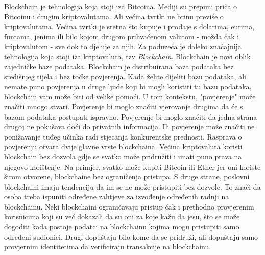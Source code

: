 \documentclass[times, utf8, diplomski]{fer}
\begin{document}
Blockchain je tehnologija koja stoji iza Bitcoina. Mediji su prepuni priča o Bitcoinu i drugim kriptovalutama. Ali većina tvrtki ne brinu previše o kriptovalutama. Većina tvrtki je sretna što kupuje i prodaje s dolarima, eurima, funtama,  jenima ili bilo kojom drugom prihvaćenom valutom - možda čak i kriptovalutom - sve dok to djeluje za njih. Za poduzeća je daleko značajnija tehnologija koja stoji iza kriptovaluta, tzv \textit{Blockchain}.
Blockchain je novi oblik zajedničke baze podataka.  Blockchain je distribuirana baza podataka bez središnjeg tijela i bez točke povjerenja. Kada želite dijeliti bazu podataka, ali nemate puno povjerenja u druge ljude koji bi mogli koristiti tu bazu podataka, blockchain vam može biti od velike pomoći. U tom kontekstu, "povjerenje" može značiti mnogo stvari. Povjerenje bi moglo značiti vjerovanje drugima da će s bazom podataka postupati ispravno. Povjerenje bi moglo značiti da jedna strana drugoj ne pokušava doći do privatnih informacija. Ili povjerenje može značiti ne ponižavanje tuđeg učinka radi stjecanja konkurentske prednosti.
Rasprava o povjerenju otvara dvije glavne vrste blockchaina. Većina kriptovaluta koristi blockchain bez dozvola gdje se svatko može pridružiti i imati puno prava na njegovo korištenje. Na primjer, svatko može kupiti Bitcoin ili Ether jer oni koriste širom otvorene, blockchaine bez ograničenja pristupa. S druge strane, poslovni blockchaini imaju tendenciju da im se ne može pristupiti bez dozvole. To znači da osoba treba ispuniti određene zahtjeve za izvođenje određenih radnji na blockchainu. Neki blockchaini ograničavaju pristup čak i prethodno provjerenim korisnicima koji su već dokazali da su oni za koje kažu da jesu, što se može dogoditi kada postoje podatci na blockchainu kojima mogu pristupiti samo određeni sudionici. Drugi dopuštaju bilo kome da se pridruži, ali dopuštaju samo provjernim identitetima da verificiraju transakcije na blockchainu.
\end{document}
